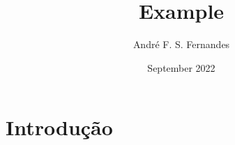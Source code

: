 \documentclass[]{ufsc-thesis-rn46-2019}
\title{Example}
\author{André F. S. Fernandes}
\date{September 2022}
\begin{document}
\maketitle

\section{Introdução}
\end{document}
